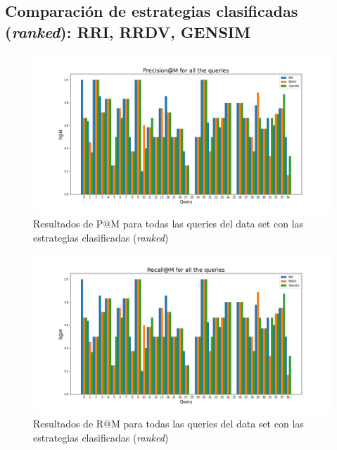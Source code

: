 \subsection{Comparación de estrategias clasificadas (\textit{ranked}): RRI, RRDV, GENSIM }

\begin{figure}[H]
    \centering
    \includegraphics[width=\textwidth]{doc/images/P@M_Ranked.png}
    \caption{Resultados de P@M para todas las queries del data set con las estrategias clasificadas (\textit{ranked})}
    \label{fig:my_label}
\end{figure}

\begin{figure}[H]
    \centering
    \includegraphics[width=\textwidth]{doc/images/R@M_Ranked.png}
    \caption{Resultados de R@M para todas las queries del data set con las estrategias clasificadas (\textit{ranked})}
    \label{fig:my_label}
\end{figure}


